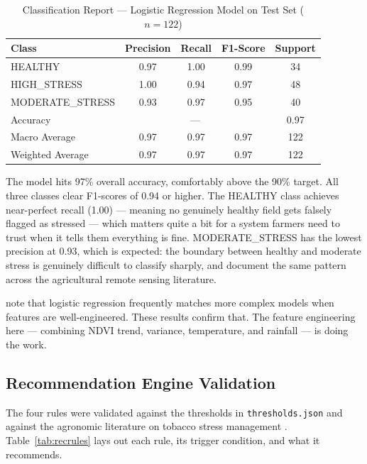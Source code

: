 \documentclass[12pt,a4paper]{report}
\begin{document}
\begin{table}[H]
  \centering
  \caption{Classification Report — Logistic Regression Model on Test Set ($n = 122$)}
  \label{tab:classreport}
  \begin{tabularx}{\textwidth}{X c c c c}
    \toprule
    \textbf{Class} & \textbf{Precision} & \textbf{Recall} & \textbf{F1-Score} & \textbf{Support} \\
    \midrule
    HEALTHY         & 0.97 & 1.00 & 0.99 & 34 \\
    HIGH\_STRESS    & 1.00 & 0.94 & 0.97 & 48 \\
    MODERATE\_STRESS & 0.93 & 0.97 & 0.95 & 40 \\
    \midrule
    Accuracy        & \multicolumn{3}{c}{---} & 0.97 \\
    Macro Average   & 0.97 & 0.97 & 0.97 & 122 \\
    Weighted Average & 0.97 & 0.97 & 0.97 & 122 \\
    \bottomrule
  \end{tabularx}
\end{table}

The model hits 97\% overall accuracy, comfortably above the 90\% target. All three classes clear F1-scores of 0.94 or higher. The HEALTHY class achieves near-perfect recall (1.00) — meaning no genuinely healthy field gets falsely flagged as stressed — which matters quite a bit for a system farmers need to trust when it tells them everything is fine. MODERATE\_STRESS has the lowest precision at 0.93, which is expected: the boundary between healthy and moderate stress is genuinely difficult to classify sharply, and \citet{weiss2020} document the same pattern across the agricultural remote sensing literature.

\citet{liakos2018} note that logistic regression frequently matches more complex models when features are well-engineered. These results confirm that. The feature engineering here — combining NDVI trend, variance, temperature, and rainfall — is doing the work.

\subsection{Recommendation Engine Validation}

The four rules were validated against the thresholds in \texttt{thresholds.json} and against the agronomic literature on tobacco stress management \citep{nyoka2020}. Table~\ref{tab:recrules} lays out each rule, its trigger condition, and what it recommends.
\end{document}
